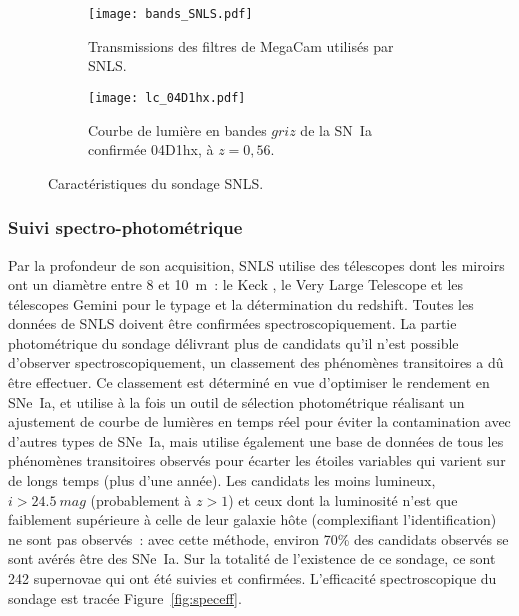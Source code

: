 \documentclass[../main/main.tex]{subfiles}
\begin{document}
\begin{figure}[ht]
    \centering
    \begin{subfigure}[]{.49\linewidth}
        \centering
        \texttt{[image: bands\_SNLS.pdf]}
        \captionsetup{justification=centering}
        \caption{Transmissions des filtres de MegaCam utilisés par SNLS.}
        \label{fig:snlsbands}
    \end{subfigure}
    \begin{subfigure}[]{.49\linewidth}
        \centering
        \texttt{[image: lc\_04D1hx.pdf]}
        \captionsetup{justification=centering}
        \caption{Courbe de lumière en bandes $griz$ de la SN~Ia confirmée
        04D1hx, à $z = 0,56$.}
        \label{fig:snlslc}
    \end{subfigure}
    \caption{Caractéristiques du sondage SNLS.}
\end{figure}

\subsubsection{Suivi spectro-photométrique}\label{sssec:snlsspectro}

Par la profondeur de son acquisition, SNLS utilise des télescopes dont les
miroirs ont un diamètre entre 8 et \SI{10}{m}~: le Keck \citep{oke1995,
ellis2008}, le Very Large Telescope \citep[VLT,][]{balland2009} et les
télescopes Gemini \citep{hook2004} pour le typage et la détermination du
redshift. Toutes les données de SNLS doivent être confirmées
spectroscopiquement. La partie photométrique du sondage délivrant plus de
candidats qu'il n'est possible d'observer spectroscopiquement, un classement des
phénomènes transitoires a dû être effectuer. Ce classement est déterminé en vue
d'optimiser le rendement en SNe~Ia, et utilise à la fois un outil de sélection
photométrique réalisant un ajustement de courbe de lumières en temps réel pour
éviter la contamination avec d'autres types de SNe~Ia, mais utilise également
une base de données de tous les phénomènes transitoires observés pour écarter
les étoiles variables qui varient sur de longs temps (plus d'une année). Les
candidats les moins lumineux, $i > \SI{24,5}{mag}$ (probablement à $z > 1$) et
ceux dont la luminosité n'est que faiblement supérieure à celle de leur galaxie
hôte (complexifiant l'identification) ne sont pas observés~: avec cette méthode,
environ 70\% des candidats observés se sont avérés être des SNe~Ia. Sur la
totalité de l'existence de ce sondage, ce sont 242 supernovae qui ont été
suivies et confirmées. L'efficacité spectroscopique du sondage est tracée
Figure~\ref{fig:speceff}.
\end{document}
